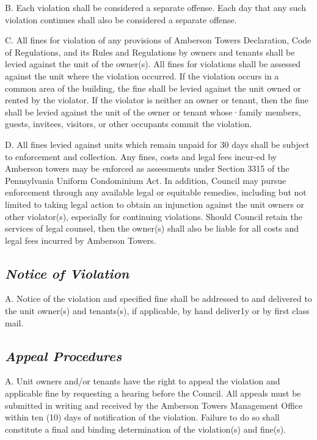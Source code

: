 \documentclass[
]{book}
\begin{document}
B. Each violation shall be considered a separate offense. Each day that any such violation continues shall also be considered a separate offense.

C. All fines for violation of any provisions of Amberson Towers Declaration, Code of Regulations, and its Rules and Regulations by owners and tenants shall be levied against the unit of the owner(s). All fines for violations shall be assessed against the unit where the violation occurred. If the violation occurs in a common area of the building, the fine shall be levied against the unit owned or rented by the violator. If the violator is neither an owner or tenant, then the fine shall be levied against the unit of the owner or tenant whose·family members, guests, invitees, visitors, or other occupants commit the violation.

D. All fines levied against units which remain unpaid for 30 days shall be subject to enforcement and collection. Any fines, costs and legal fees incur-ed by Amberson towers may be enforced as assessments under Section 3315 of the Pennsylvania Uniform Condominium Act. In addition, Council may pursue enforcement through any available legal or equitable remedies, including but not limited to taking legal action to obtain an injunction against the unit owners or other violator(s), especially for continuing violations. Should Council retain the services of legal counsel, then the owner(s) shall also be liable for all costs and legal fees incurred by Amberson Towers.

\hypertarget{notice-of-violation-2}{%
\subsection*{\texorpdfstring{\emph{Notice of Violation}}{Notice of Violation}}\label{notice-of-violation-2}}

A. Notice of the violation and specified fine shall be addressed to and delivered to the unit owner(s) and tenants(s), if applicable, by hand deliver1y or by first class mail.

\hypertarget{appeal-procedures-2}{%
\subsection*{\texorpdfstring{\emph{Appeal Procedures}}{Appeal Procedures}}\label{appeal-procedures-2}}

A. Unit owners and/or tenants have the right to appeal the violation and applicable fine by requesting a hearing before the Council. All appeals must be submitted in writing and received by the Amberson Towers Management Office within ten (10) days of notification of the violation. Failure to do so shall constitute a final and binding determination of the violation(s) and fine(s).
\end{document}
